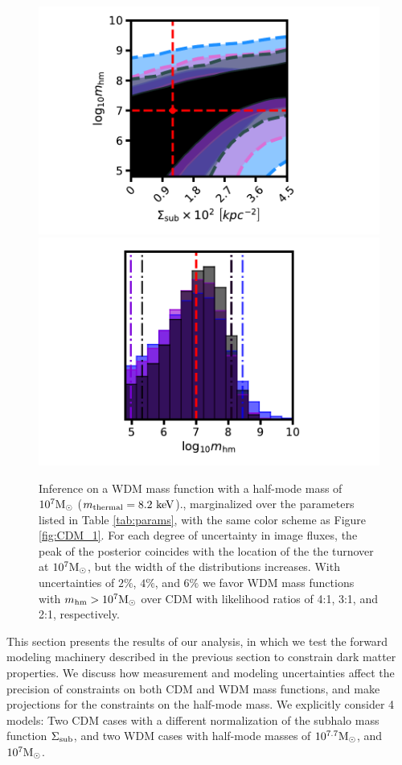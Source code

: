 \begin{figure}
	\includegraphics[clip,trim=2cm 0cm 3.5cm
	0.25cm,width=.48\textwidth,keepaspectratio]{./figures_LOSforward/WDM_246_7_joint.pdf}
	\includegraphics[clip,trim=2cm 0cm 3.5cm
	0.5cm,width=.48\textwidth,keepaspectratio]{./figures_LOSforward/WDM_246_7_mhm.pdf}
	\caption{\label{fig:WDM_2} Inference on a WDM mass function with a half-mode mass of $10^{7} {\rm{M}_{\odot}}$ ($m_{\rm{thermal}} = 8.2 \ \rm{keV}$)., marginalized over the parameters listed in Table \ref{tab:params}, with the same color scheme as Figure \ref{fig:CDM_1}. For each degree of uncertainty in image fluxes, the peak of the posterior coincides with the location of the the turnover at $10^{7}{\rm{M}_{\odot}}$, but the width of the distributions increases. With uncertainties of $2\%$, $4\%$, and $6\%$ we favor WDM mass functions with ${m_{\rm{hm}}} > 10^{7} {\rm{M}_{\odot}}$ over CDM with likelihood ratios of 4:1, 3:1, and 2:1, respectively.}
\end{figure}	
This section presents the results of our analysis, in which we test the forward modeling machinery described in the previous section to constrain dark matter properties. We discuss how measurement and modeling uncertainties affect the precision of constraints on both CDM and WDM mass functions, and make projections for the constraints on the half-mode mass. We explicitly consider 4 models: Two CDM cases with a different normalization of the subhalo mass function $\Sigma_{\rm{sub}}$, and two WDM cases with half-mode masses of $10^{7.7} {\rm{M}_{\odot}}$, and $10^{7} {\rm{M}_{\odot}}$. 

